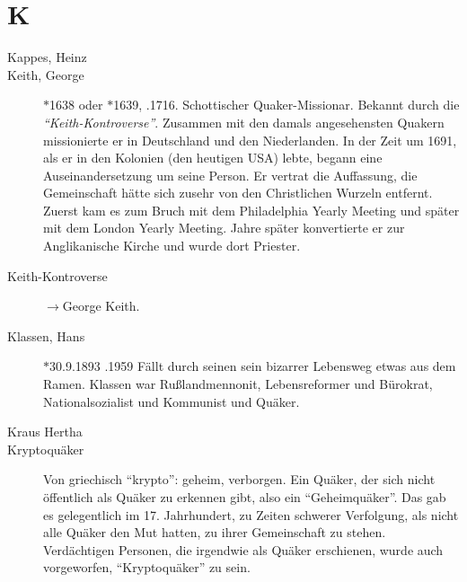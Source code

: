 \section*{K}

\articlesize

\begin{description}

\item[Kappes, Heinz]

 \item[Keith, George] $\ast$1638 oder $\ast$1639, .1716. Schottischer Quaker-Missionar. Bekannt durch die \textit{"`Keith-Kontroverse"'}. Zusammen mit den damals angesehensten Quakern missionierte er in Deutschland und den Niederlanden. In der Zeit um 1691, als er in den Kolonien (den heutigen USA) lebte, begann eine Auseinandersetzung um seine Person. Er vertrat die Auffassung, die Gemeinschaft hätte sich zusehr von den Christlichen Wurzeln entfernt. Zuerst kam es zum Bruch mit dem Philadelphia Yearly Meeting und später mit dem London Yearly Meeting. Jahre später konvertierte er zur Anglikanische Kirche und wurde dort Priester.

 \item[Keith-Kontroverse] $\to$George Keith.

 \item[Klassen, Hans] $\ast$30.9.1893 .1959 Fällt durch seinen sein bizarrer Lebensweg etwas aus dem Ramen. Klassen war Rußlandmennonit, Lebensreformer und Bürokrat, Nationalsozialist und Kommunist und Quäker.

 \item[Kraus Hertha]

 \item[Kryptoquäker] Von griechisch "`krypto"': geheim, verborgen. Ein Quäker, der sich nicht öffentlich als Quäker zu erkennen gibt, also ein "`Geheimquäker"'. Das gab es gelegentlich im 17. Jahrhundert, zu Zeiten schwerer Verfolgung, als nicht alle Quäker den Mut hatten, zu ihrer Gemeinschaft zu stehen. Verdächtigen Personen, die irgendwie als Quäker erschienen, wurde auch vorgeworfen, "`Kryptoquäker"' zu sein.

 \end{description}
\normalsize
